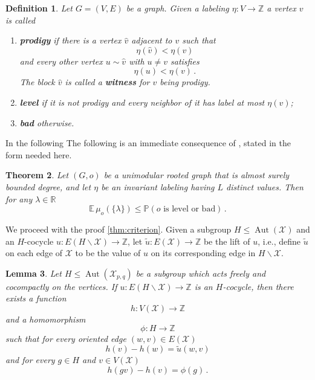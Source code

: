\documentclass[11pt]{article}
\newtheorem{theorem}{Theorem}[section]
\newtheorem{lemma}[theorem]{Lemma}
\newtheorem{definition}[theorem]{Definition}
\theoremstyle{remark}
\newcommand{\cX}{\mathcal X}
\newcommand{\Z}{\mathbb Z}
\newcommand{\R}{\mathbb R}
\newcommand{\Aut}{\operatorname{Aut}}
\begin{document}
\begin{definition}\label{def:blocks}
Let $G=(V,E)$ be a graph. Given a labeling $\eta:V \to \Z$ a vertex
$v$ is called
\begin{enumerate}[label=(\roman*)]
\item {\bf prodigy} if there is a vertex $\hat v$ adjacent to $v$ such that
\[
\eta(\hat v)<\eta(v)
\]
and every other vertex $u\sim\hat v$ with $u\neq v$ satisfies
\[
\eta(u)<\eta(v) \, .
\]
The block $\hat v$ is called a {\bf witness} for $v$ being prodigy.

\item {\bf level} if it is not prodigy and every neighbor of it has label at most $\eta(v)$;
\item {\bf bad} otherwise.
\end{enumerate}
\end{definition}

In the following 
The following is an immediate consequence of \cite[Theorem 2.3]{BSV17}, stated in the form needed here.

\begin{theorem}\label{thm:Bordenave} 
Let $(G,o)$ be a unimodular rooted graph that is almost surely bounded degree, and let $\eta$ be an invariant labeling having $L$ distinct values. Then for any $\lambda\in \R$
\[
\mathbb E\,\mu_o(\{\lambda\})
\le
\mathbb P(o\text{ is level or bad}) \, . \]

\end{theorem}

We proceed with the proof \cref{thm:criterion}. %
Given a subgroup $H\leq \Aut(\cX)$ and an $H$-cocycle $u:E(H\backslash \cX)\to \Z$, let $\tilde u:E(\cX)\to \Z$ be the lift of $u$, i.e., define \(\widetilde u\) on each edge of \(\cX\) to be the value of \(u\) on its corresponding edge in $H\backslash \cX$.

\begin{lemma}\label{lem:height} Let $H\leq \Aut(\cX_{p,q})$ be a subgroup which acts freely and cocompactly on the vertices. If $u:E(H\backslash \cX)\to \Z$ is an $H$-cocycle, then there exists a function
\[
h:V(\mathcal X) \longrightarrow\Z
\]
and a homomorphism
\[
\phi:H\longrightarrow\Z
\]
such that for every oriented edge $(w,v)\in E(\mathcal X)$
\[
h(v)-h(w)=\tilde{u}(w,v)
\]
and for every $g\in H$ and $v\in V(\cX)$ 
\[
h(gv)-h(v)=\phi(g) \, .
\]
\end{lemma}
\end{document}
